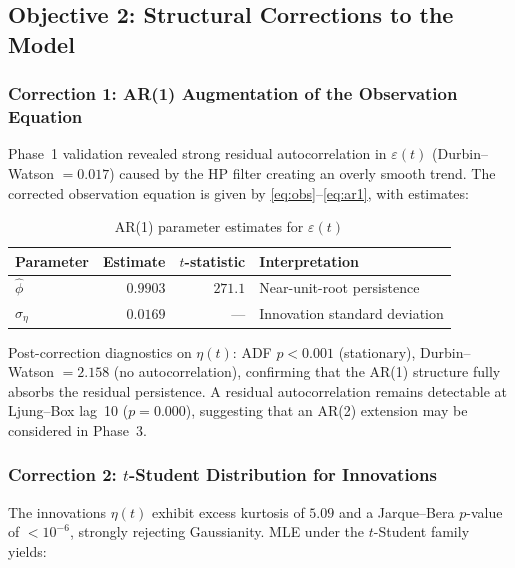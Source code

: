 \documentclass[12pt,a4paper]{article}
\theoremstyle{definition}
\theoremstyle{remark}
\begin{document}
\subsection{Objective 2: Structural Corrections to the Model}

\subsubsection{Correction 1: AR(1) Augmentation of the Observation Equation}

Phase~1 validation revealed strong residual autocorrelation in
$\varepsilon(t)$ (Durbin--Watson $= 0.017$) caused by the HP filter
creating an overly smooth trend. The corrected observation equation
is given by \eqref{eq:obs}--\eqref{eq:ar1}, with estimates:

\begin{table}[H]
  \centering
  \caption{AR(1) parameter estimates for $\varepsilon(t)$}
  \label{tab:ar1}
  \begin{tabular}{lrrl}
    \toprule
    Parameter & Estimate & $t$-statistic & Interpretation \\
    \midrule
    $\hat{\phi}$ & $0.9903$ & $271.1$ & Near-unit-root persistence \\
    $\hat{\sigma}_\eta$ & $0.0169$ & --- & Innovation standard deviation \\
    \bottomrule
  \end{tabular}
\end{table}

\noindent Post-correction diagnostics on $\eta(t)$: ADF $p < 0.001$
(stationary), Durbin--Watson $= 2.158$ (no autocorrelation), confirming
that the AR(1) structure fully absorbs the residual persistence.
A residual autocorrelation remains detectable at Ljung--Box lag~10
($p = 0.000$), suggesting that an AR(2) extension may be considered in
Phase~3.

\subsubsection{Correction 2: $t$-Student Distribution for Innovations}

The innovations $\eta(t)$ exhibit excess kurtosis of $5.09$ and a
Jarque--Bera $p$-value of $< 10^{-6}$, strongly rejecting Gaussianity.
MLE under the $t$-Student family yields:
\end{document}
